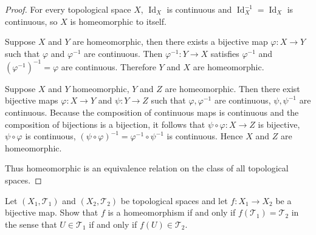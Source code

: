 \begin{proof}
	For every topological space $X$, $\operatorname{Id}_{X}$ is continuous and $\operatorname{Id}_{X}^{-1} = \operatorname{Id}_{X}$ is continuous, so $X$ is homeomorphic to itself.

	Suppose $X$ and $Y$ are homeomorphic, then there exists a bijective map $\varphi: X\to Y$ such that $\varphi$ and $\varphi^{-1}$ are continuous. Then $\varphi^{-1}: Y \to X$ satisfies $\varphi^{-1}$ and ${(\varphi^{-1})}^{-1} = \varphi$ are continuous. Therefore $Y$ and $X$ are homeomorphic.

	Suppose $X$ and $Y$ homeomorphic, $Y$ and $Z$ are homeomorphic. Then there exist bijective maps $\varphi: X\to Y$ and $\psi: Y\to Z$ such that $\varphi, \varphi^{-1}$ are continuous, $\psi, \psi^{-1}$ are continuous. Because the composition of continuous maps is continuous and the composition of bijections is a bijection, it follows that $\psi\circ \varphi: X\to Z$ is bijective, $\psi\circ\varphi$ is continuous, ${(\psi\circ\varphi)}^{-1} = \varphi^{-1}\circ\psi^{-1}$ is continuous. Hence $X$ and $Z$ are homeomorphic.

	Thus homeomorphic is an equivalence relation on the class of all topological spaces.
\end{proof}

\begin{exercise}{2.21}\label{exercise:2.21}
	Let $(X_{1}, \mathscr{T}_{1})$ and $(X_{2}, \mathscr{T}_{2})$ be topological spaces and let $f: X_{1}\to X_{2}$ be a bijective map. Show that $f$ is a homeomorphism if and only if $f(\mathscr{T}_{1}) = \mathscr{T}_{2}$ in the sense that $U\in\mathscr{T}_{1}$ if and only if $f(U)\in \mathscr{T}_{2}$.
\end{exercise}

